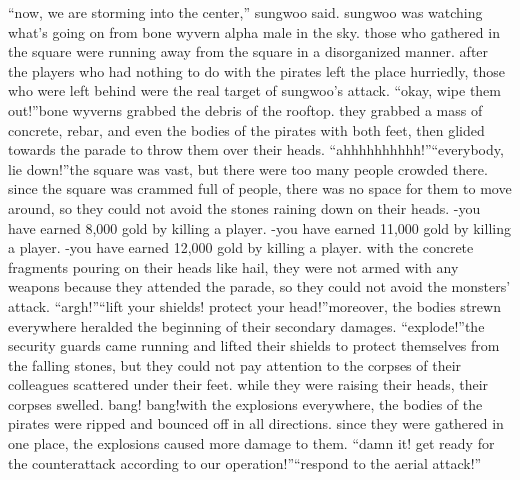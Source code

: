 “now, we are storming into the center,” sungwoo said.
sungwoo was watching what’s going on from bone wyvern alpha male in the sky.
those who gathered in the square were running away from the square in a disorganized manner.
 after the players who had nothing to do with the pirates left the place hurriedly, those who were left behind were the real target of sungwoo’s attack.
“okay, wipe them out!”bone wyverns grabbed the debris of the rooftop.
 they grabbed a mass of concrete, rebar, and even the bodies of the pirates with both feet, then glided towards the parade to throw them over their heads.
“ahhhhhhhhhh!”“everybody, lie down!”the square was vast, but there were too many people crowded there.
 since the square was crammed full of people, there was no space for them to move around, so they could not avoid the stones raining down on their heads.
-you have earned 8,000 gold by killing a player.
-you have earned 11,000 gold by killing a player.
-you have earned 12,000 gold by killing a player.
with the concrete fragments pouring on their heads like hail, they were not armed with any weapons because they attended the parade, so they could not avoid the monsters’ attack.
“argh!”“lift your shields! protect your head!”moreover, the bodies strewn everywhere heralded the beginning of their secondary damages.
“explode!”the security guards came running and lifted their shields to protect themselves from the falling stones, but they could not pay attention to the corpses of their colleagues scattered under their feet.
 while they were raising their heads, their corpses swelled.
bang! bang!with the explosions everywhere, the bodies of the pirates were ripped and bounced off in all directions.
 since they were gathered in one place, the explosions caused more damage to them.
“damn it! get ready for the counterattack according to our operation!”“respond to the aerial attack!”

 